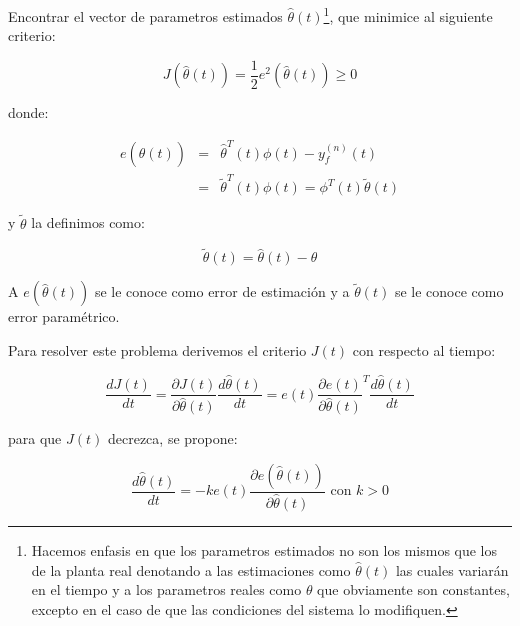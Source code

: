             \begin{problema}
                Encontrar el vector de parametros estimados $\hat{\theta}(t)$\footnote{Hacemos enfasis en que los parametros estimados no son los mismos que los de la planta real denotando a las estimaciones como $\hat{\theta}(t)$ las cuales variarán en el tiempo y a los parametros reales como $\theta$ que obviamente son constantes, excepto en el caso de que las condiciones del sistema lo modifiquen.}, que minimice al siguiente criterio:

                \begin{equation}
                    J \left( \hat{\theta}(t) \right) = \frac{1}{2} e^2 \left( \hat{\theta}(t) \right) \ge 0
                \end{equation}

                donde:

                \begin{eqnarray}
                    e \left( \hat{\theta}(t) \right) & = & \hat{\theta}^T(t) \phi(t) - y_f^{(n)}(t) \nonumber \\
                    & = & \tilde{\theta}^T(t) \phi(t) = \phi^T(t) \tilde{\theta}(t)
                \end{eqnarray}

                y $\tilde{\theta}$ la definimos como:

                \begin{equation}
                    \tilde{\theta}(t) = \hat{\theta}(t) - \theta
                \end{equation}

                A $e \left( \hat{\theta}(t) \right)$ se le conoce como error de estimación y a $\tilde{\theta}(t)$ se le conoce como error paramétrico.
            \end{problema}

            Para resolver este problema derivemos el criterio $J(t)$ con respecto al tiempo:

            \begin{equation} \label{eq:adap6}
                \frac{d J(t)}{dt} = \frac{\partial J(t)}{\partial \hat{\theta}(t)} \frac{d \hat{\theta}(t)}{dt} = e(t) \frac{\partial e(t)}{\partial \hat{\theta}(t)}^T \frac{d \hat{\theta}(t)}{dt}
            \end{equation}

            para que $J(t)$ decrezca, se propone:

            \begin{equation}\label{eq:adap7}
                \frac{d \hat{\theta}(t)}{dt} = -k e(t) \frac{\partial e(\hat{\theta}(t))}{\partial \hat{\theta}(t)} \text{ con } k > 0
            \end{equation}

